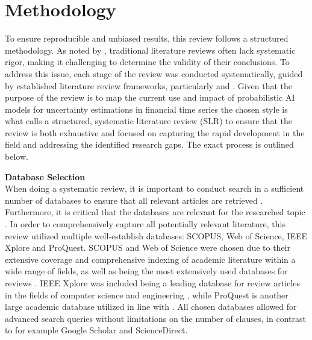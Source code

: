 \section{Methodology}
\label{sec:methodology}

To ensure reproducible and unbiased results, this review follows a structured methodology. As noted by \textcite{tranfield_et_al}, traditional literature reviews often lack systematic rigor, making it challenging to determine the validity of their conclusions. To address this issue, each stage of the review was conducted systematically, guided by established literature review frameworks, particularly \textcite{snyder_2019} and \textcite{marzi_et_al_2024}. Given that the purpose of the review is to map the current use and impact of probabilistic AI models for uncertainty estimations in financial time series the chosen style is what \textcite{snyder_2019} calls a structured, systematic literature review (SLR) to ensure that the review is both exhaustive and focused on capturing the rapid development in the field and addressing the identified research gaps. The exact process is outlined below.


\textbf{Database Selection} \\
When doing a systematic review, it is important to conduct search in a sufficient number of databases to ensure that all relevant articles are retrieved \parencite{hiebl_2021}. Furthermore, it is critical that the databases are relevant for the researched topic \parencite{marzi_et_al_2024}. In order to comprehensively capture all potentially relevant literature, this review utilized multiple well-establish databases: SCOPUS, Web of Science, IEEE Xplore and ProQuest. SCOPUS and Web of Science were chosen due to their extensive coverage and comprehensive indexing of academic literature within a wide range of fields, as well as being the most extensively used databases for reviews \parencite{marzi_et_al_2024}. IEEE Xplore was included being a leading database for review articles in the fields of computer science and engineering \parencite{suhaimi2020systematic, carvalho2019systematic, cavacini2015best}, while ProQuest is another large academic database utilized in line with \textcite{gunnarsson2024}. All chosen databases allowed for advanced search queries without limitations on the number of clauses, in contrast to for example Google Scholar and ScienceDirect. 

